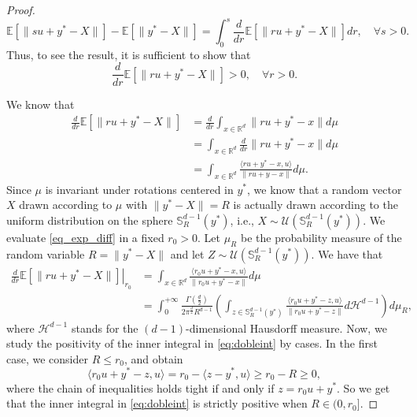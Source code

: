 \documentclass[letter,11pt, reqno]{amsart}
\newcommand{\R}{\mathbb{R}}
\newcommand{\E}{\mathbb{E}}
\newcommand{\U}{\mathcal{U}}
\newcommand{\HH}{\mathcal{H}}
\renewcommand{\SS}{\mathbb{S}}
\renewcommand{\;}{\quad}
\theoremstyle{thmstyleone}%
\theoremstyle{thmstyletwo}%
\theoremstyle{thmstylethree}%
\begin{document}
\begin{proof}
    \begin{equation*}
        \E\left[\|su+y^*-X\|\right]-\E\left[\|y^*-X\|\right]=\int_0^s\frac{d}{dr}\E\left[\|ru+y^*-X\|\right]dr, \; \forall s>0.
    \end{equation*}
    Thus, to see the result, it is sufficient to show that
    \begin{equation*}
        \frac{d}{dr}\E\left[\|ru+y^*-X\|\right]>0, \; \forall r>0.
    \end{equation*}
    
    We know that
    \begin{align}
        \frac{d}{dr}\E\left[\|ru+y^*-X\|\right]&=\frac{d}{dr}\int_{x\in \R^d}\|ru+y^*-x\|d\mu \nonumber\\
        & = \int_{x\in \R^d}\frac{d}{dr}\|ru+y^*-x\|d\mu \nonumber\\
        & = \int_{x\in \R^d}\frac{\langle ru+y^*-x, u\rangle}{\|ru+y-x\|}d\mu \label{eq_exp_diff}.
    \end{align}
    Since $\mu$ is invariant under rotations centered in $y^*$, we know that a random vector $X$ drawn according to $\mu$ with $\|y^*-X\|=R$ is actually drawn according to the uniform distribution on the sphere $\SS^{d-1}_R(y^*)$, i.e., $X\sim \U(\SS_R^{d-1}(y^*))$. We evaluate \eqref{eq_exp_diff} in a fixed $r_0>0$. Let $\mu_{R}$ be the probability measure of the random variable $R=\|y^*-X\|$ and let $Z\sim \U(\SS_R^{d-1}(y^*))$. We have that
    \begin{align}
        \left.\frac{d}{dr}\E\left[\|ru+y^*-X\|\right]\right|_{r_0}& = \int_{x\in \R^d}\frac{\langle r_0u+y^*-x, u\rangle}{\|r_0u+y^*-x\|}d\mu \nonumber \\
        & = \int_0^{+\infty}\frac{\Gamma\left(\frac{d}{2}\right)}{2\pi^{\frac{d}{2}}R^{d-1}}\left(\int_{z\in\SS^{d-1}_R(y^*)}\frac{\langle r_0u+y^*-z, u\rangle}{\|r_0u+y^*-z\|}d\HH^{d-1}\right)d\mu_R,\label{eq:dobleint}
    \end{align}
    where $\HH^{d-1}$ stands for the $(d-1)$-dimensional Hausdorff measure. Now, we study the positivity of the inner integral in \eqref{eq:dobleint} by cases. In the first case, we consider $R\leq r_0$, and obtain
    \begin{equation*}
        \langle r_0u+y^*-z, u\rangle = r_0-\langle z-y^*,u\rangle \geq r_0-R\geq 0,
    \end{equation*}
    where the chain of inequalities holds tight if and only if $z = r_0u+y^*$. So we get that the inner integral in \eqref{eq:dobleint} is strictly positive when $R \in (0, r_0]$. 


\end{proof}
\end{document}
